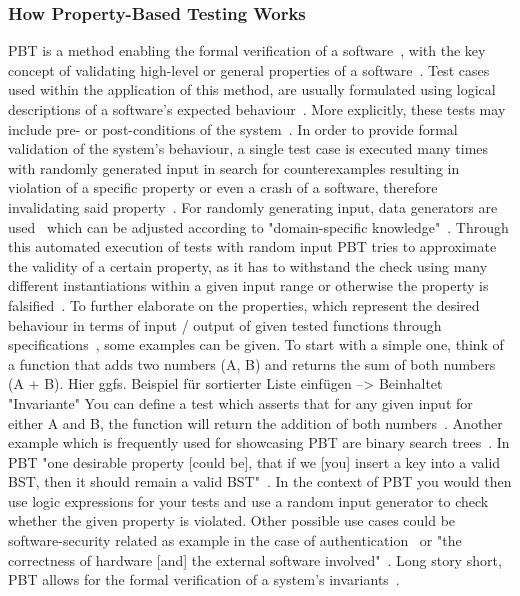 \documentclass[runningheads]{llncs}
\begin{document}
\subsubsection{How Property-Based Testing Works}
PBT is a method enabling the formal verification of a software~\cite{Chen2022,Fink1997,Honarvar2020,Paraskevopoulou2015}, with the key concept of validating high-level or general properties of a software~\cite{Fink1997,Loescher2017,Honarvar2020,Corgozinho2023}. Test cases used within the application of this method, are usually formulated using logical descriptions of a software's expected behaviour~\cite{Chen2022,Fink1997,Honarvar2020,Loescher2017,Corgozinho2023}. More explicitly, these tests may include pre- or post-conditions of the system~\cite{Honarvar2020}. In order to provide formal validation of the system's behaviour, a single test case is executed many times with randomly generated input in search for counterexamples resulting in violation of a specific property or even a crash of a software, therefore invalidating said property~\cite{Chen2022,Loescher2017,Padhye2019,ElazarMittelman2023,Paraskevopoulou2015,Corgozinho2023}. For randomly generating input, data generators are used~\cite{Chen2022,Loescher2017,Padhye2019,ElazarMittelman2023} which can be adjusted according to "domain-specific knowledge"~\cite{Chen2022}. Through this automated execution of tests with random input PBT tries to approximate the validity of a certain property, as it has to withstand the check using many different instantiations within a given input range or otherwise the property is falsified~\cite{Fink1997,ElazarMittelman2023,Corgozinho2023,Paraskevopoulou2015}. To further elaborate on the properties, which represent the desired behaviour in terms of input / output of given tested functions through specifications~\cite{Chen2022,Fink1997,Loescher2017}, some examples can be given. To start with a simple one, think of a function that adds two numbers (A, B) and returns the sum of both numbers (A + B). Hier ggfs. Beispiel für sortierter Liste einfügen --> Beinhaltet "Invariante" You can define a test which asserts that for any given input for either A and B, the function will return the addition of both numbers~\cite{Corgozinho2023}. Another example which is frequently used for showcasing PBT are binary search trees~\cite{Corgozinho2023,Shi2023}. In PBT "one desirable property [could be], that if we [you] insert a key into a valid BST, then it should remain a valid BST"~\cite{Shi2023}. In the context of PBT you would then use logic expressions for your tests and use a random input generator to check whether the given property is violated. Other possible use cases could be software-security related as example in the case of authentication~\cite{Fink1997} or "the correctness of hardware [and] the external software involved"~\cite{Chen2022}. Long story short, PBT allows for the formal verification of a system's invariants~\cite{Fink1997,ElazarMittelman2023,Corgozinho2023}.
\end{document}
